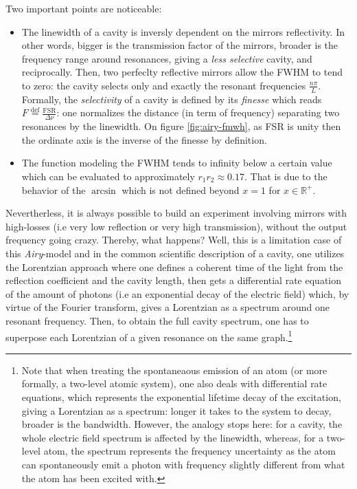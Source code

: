 \documentclass[12pt]{report}
\begin{document}
Two important points are noticeable:
\begin{itemize}
	\item The linewidth of a cavity is inversly dependent on the mirrors reflectivity. In other words, bigger is the transmission factor of the mirrors, broader is the frequency range around resonances, giving a \textit{less selective} cavity, and reciprocally. Then, two perfeclty reflective mirrors allow the FWHM to tend to zero: the cavity selects only and exactly the resonant frequencies $\frac{n\pi}{L}$. Formally, the \textit{selectivity} of a cavity is defined by its \textit{finesse} which reads $F \stackrel{\text{def}}{=} \frac{\textrm{FSR}}{\Delta\nu}$: one normalizes the distance (in term of frequency) separating two resonances by the linewidth. On figure \ref{fig:airy-fmwh}, as FSR is unity then the ordinate axis is the inverse of the finesse by definition.
	\item The function modeling the FWHM tends to infinity below a certain value which can be evaluated to approximately $r_1r_2 \approx 0.17$. That is due to the behavior of the $\arcsin$ which is not defined beyond $x=1$ for $x \in \mathbb{R}^+$. 
\end{itemize}

Nevertherless, it is always possible to build an experiment involving mirrors with high-losses (i.e very low reflection or very high transmission), without the output frequency going crazy. Thereby, what happens? Well, this is a limitation case of this \textit{Airy}-model and in the common scientific description of a cavity, one utilizes the Lorentzian approach where one defines a coherent time of the light from the reflection coefficient and the cavity length, then gets a differential rate equation of the amount of photons (i.e an exponential decay of the electric field) which, by virtue of the Fourier transform, gives a Lorentzian as a spectrum around one resonant frequency. Then, to obtain the full cavity spectrum, one has to superpose each Lorentzian of a given resonance on the same graph.\footnote{Note that when treating the spontaneaous emission of an atom (or more formally, a two-level atomic system), one also deals with differential rate equations, which represents the exponential lifetime decay of the excitation, giving a Lorentzian as a spectrum: longer it takes to the system to decay, broader is the bandwidth. However, the analogy stops here: for a cavity, the whole electric field spectrum is affected by the linewidth, whereas, for a two-level atom, the spectrum represents the frequency uncertainty as the atom can spontaneously emit a photon with frequency slightly different from what the atom has been excited with.}
\end{document}
